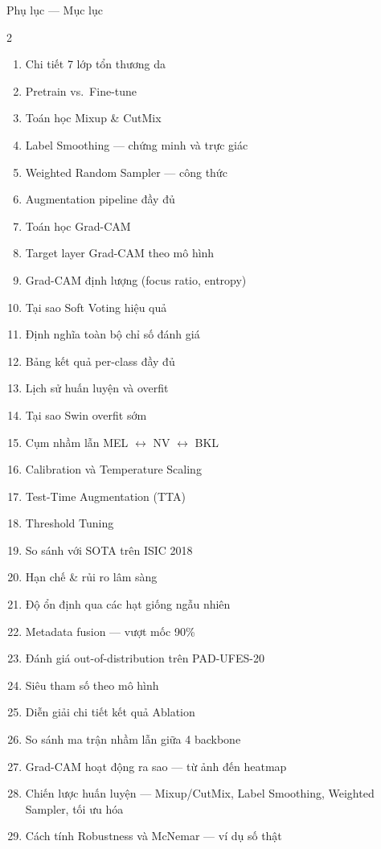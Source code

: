 \documentclass[10pt, aspectratio=169]{beamer}
\begin{document}
\begin{frame}{Phụ lục --- Mục lục}
    \footnotesize
    \begin{multicols}{2}
    \begin{enumerate}
        \item Chi tiết 7 lớp tổn thương da
        \item Pretrain vs.\ Fine-tune
        \item Toán học Mixup \& CutMix
        \item Label Smoothing --- chứng minh và trực giác
        \item Weighted Random Sampler --- công thức
        \item Augmentation pipeline đầy đủ
        \item Toán học Grad-CAM
        \item Target layer Grad-CAM theo mô hình
        \item Grad-CAM định lượng (focus ratio, entropy)
        \item Tại sao Soft Voting hiệu quả
        \item Định nghĩa toàn bộ chỉ số đánh giá
        \item Bảng kết quả per-class đầy đủ
        \item Lịch sử huấn luyện và overfit
        \item Tại sao Swin overfit sớm
        \item Cụm nhầm lẫn MEL $\leftrightarrow$ NV $\leftrightarrow$ BKL
        \item Calibration và Temperature Scaling
        \item Test-Time Augmentation (TTA)
        \item Threshold Tuning
        \item So sánh với SOTA trên ISIC 2018
        \item Hạn chế \& rủi ro lâm sàng
        \item Độ ổn định qua các hạt giống ngẫu nhiên
        \item Metadata fusion --- vượt mốc 90\%
        \item Đánh giá out-of-distribution trên PAD-UFES-20
        \item Siêu tham số theo mô hình
        \item Diễn giải chi tiết kết quả Ablation
        \item So sánh ma trận nhầm lẫn giữa 4 backbone
        \item Grad-CAM hoạt động ra sao --- từ ảnh đến heatmap
        \item Chiến lược huấn luyện --- Mixup/CutMix, Label Smoothing, Weighted Sampler, tối ưu hóa
        \item Cách tính Robustness và McNemar --- ví dụ số thật
    \end{enumerate}
    \end{multicols}
\end{frame}
\end{document}
